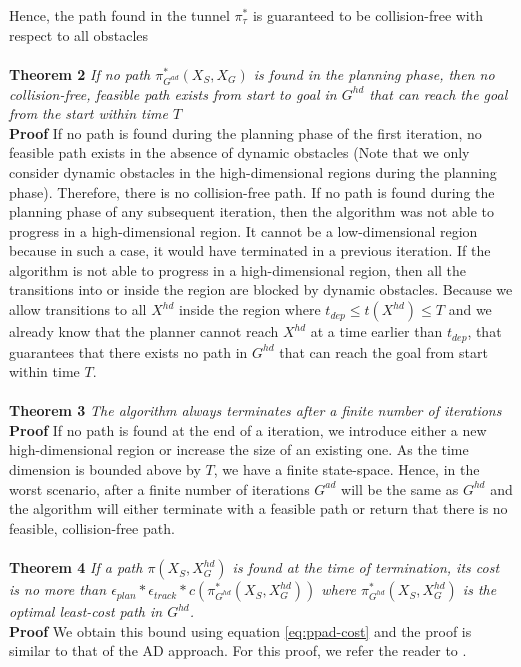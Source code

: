 Hence, the path found in the tunnel $\pi_\tau^*$ is guaranteed to be collision-free with respect to all obstacles \QEDB \\ \\
\textbf{Theorem 2} \textit{If no path $\pi_{G^{ad}}^*(X_S,X_G)$ is found in the planning phase, then no collision-free, feasible path exists from start to goal in $G^{hd}$ that can reach the goal from the start within time $T$} \\
\textbf{Proof} If no path is found during the planning phase of the first iteration, no feasible path exists in the absence of dynamic obstacles (Note that we only consider dynamic obstacles in the high-dimensional regions during the planning phase). Therefore, there is no collision-free path. If no path is found during the planning phase of any subsequent iteration, then the algorithm was not able to progress in a high-dimensional region. It cannot be a low-dimensional region because in such a case, it would have terminated in a previous iteration. If the algorithm is not able to progress in a high-dimensional region, then all the transitions into or inside the region are blocked by dynamic obstacles. Because we allow transitions to all $X^{hd}$ inside the region where $t_{dep} \leq t(X^{hd}) \leq T$ and we already know that the planner cannot reach $X^{hd}$ at a time earlier than $t_{dep}$, that guarantees that there exists no path in $G^{hd}$ that can reach the goal from start within time $T$.\QEDB\\ \\
\textbf{Theorem 3} \textit{The algorithm always terminates after a finite number of iterations} \\
\textbf{Proof} If no path is found at the end of a iteration, we introduce either a new high-dimensional region or increase the size of an existing one. As the time dimension is bounded above by $T$, we have a finite state-space. Hence, in the worst scenario, after a finite number of iterations $G^{ad}$ will be the same as $G^{hd}$ and the algorithm will either terminate with a feasible path or return that there is no feasible, collision-free path. \QEDB \\\\
\iftrue
\textbf{Theorem 4} \textit{If a path $\pi(X_S, X_G^{hd})$ is found at the time of termination, its cost is no more than $\epsilon_{plan}*\epsilon_{track}*c(\pi_{G^{hd}}^*(X_S,X_G^{hd}))$ where $\pi_{G^{hd}}^*(X_S,X_G^{hd})$ is the optimal least-cost path in $G^{hd}$.} \\
\textbf{Proof} We obtain this bound using equation \ref{eq:ppad-cost} and the proof is similar to that of the AD approach. For this proof, we refer the reader to \cite{gochev2011path}. \QEDB 
